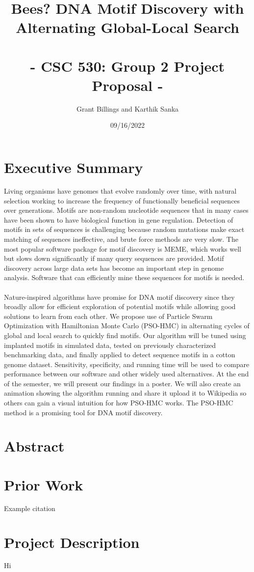 \documentclass{article}
\title{%
	\Large Bees? DNA Motif Discovery with Alternating Global-Local Search  \\
	\large \; \\ - CSC 530: Group 2 Project Proposal -}
\author{Grant Billings and Karthik Sanka}
\date{09/16/2022}
\begin{document}
\maketitle
\section{Executive Summary}
Living organisms have genomes that evolve randomly over time, with natural selection working to increase the frequency of functionally beneficial sequences over generations. Motifs are non-random nucleotide sequences that in many cases have been shown to have biological function in gene regulation. Detection of motifs in sets of sequences is challenging because random mutations make exact matching of sequences ineffective, and brute force methods are very slow. The most popular software package for motif discovery is MEME, which works well but slows down significantly if many query sequences are provided. Motif discovery across large data sets has become an important step in genome analysis. Software that can efficiently mine these sequences for motifs is needed.  \\\\
Nature-inspired algorithms have promise for DNA motif discovery since they broadly allow for efficient exploration of potential motifs while allowing good solutions to learn from each other. We propose use of Particle Swarm Optimization with Hamiltonian Monte Carlo (PSO-HMC) in alternating cycles of global and local search to quickly find motifs. Our algorithm will be tuned using implanted motifs in simulated data, tested on previously characterized benchmarking data, and finally applied to detect sequence motifs in a cotton genome dataset. Sensitivity, specificity, and running time will be used to compare performance between our software and other widely used alternatives. At the end of the semester, we will present our findings in a poster. We will also create an animation showing the algorithm running and share it upload it to Wikipedia so others can gain a visual intuition for how PSO-HMC works. The PSO-HMC method is a promising tool for DNA motif discovery.
\section{Abstract}
\section{Prior Work}
Example citation \cite{fister2013brief}
\section{Project Description}
Hi
\end{document}
